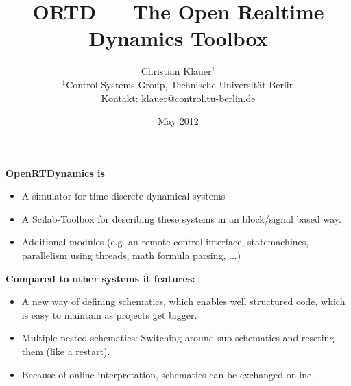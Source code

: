 \documentclass[serif,9pt,xcolor=dvipsnames]{beamer}
\title[]{ORTD --- The Open Realtime Dynamics Toolbox}
\subtitle{} %
\date{May 2012}
\author{Christian Klauer$^{1}$\\
\tiny $^{1}$Control Systems Group, Technische Universität Berlin\\
Kontakt: klauer@control.tu-berlin.de
}
\begin{document}




\begin{frame}
  \maketitle
\end{frame}


\begin{frame}

\textbf{OpenRTDynamics is}

 \begin{itemize}
  \item A simulator for time-discrete dynamical systems
  \item A Scilab-Toolbox for describing these systems in an block/signal based way.
  \item Additional modules (e.g. an remote control interface, statemachines, parallelism using threads, math formula parsing, ...)
 \end{itemize}

\textbf{Compared to other systems it features:}
\begin{itemize}
 \item A new way of defining schematics, which enables well structured code, which is easy to maintain as projects get bigger.
 \item Multiple nested-schematics: Switching around sub-schematics and reseting them (like a restart).
 \item Because of online interpretation, schematics can be exchanged online.
\end{itemize}


\end{frame}
\end{document}

